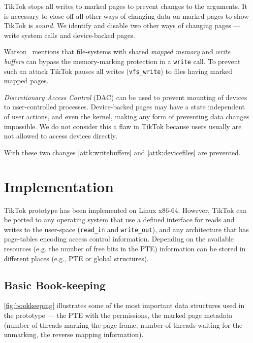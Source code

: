 \documentclass[conference]{IEEEtran}
\newcommand{\sysname}{TikTok}
\begin{document}
\sysname{} stops all writes to marked pages to prevent changes to the arguments.
It is necessary to close off all other ways of changing data on marked pages to
show \sysname{} is \emph{sound}. We identify and disable two other ways of
changing pages --- write system calls and device-backed pages.

Watson~\cite{watson2007exploiting} mentions that file-systems with shared
\emph{mapped memory} and \emph{write buffers} can bypass the memory-marking
protection in a \texttt{write} call. To prevent such an attack \sysname{} pauses
all writes (\texttt{vfs\_write}) to files having marked mapped pages.

\emph{Discretionary Access Control} (DAC) can be used to prevent mounting of
devices to user-controlled processes. Device-backed pages may have a state
independent of user actions, and even the kernel, making any form of preventing
data changes impossible. We do not consider this a flaw in \sysname{} because
users usually are not allowed to access devices directly.

With these two changes \autoref{attk:writebuffers} and \autoref{attk:devicefiles}
are prevented.


\section{Implementation}
\label{sec:implementation}

\sysname{} prototype has been implemented on Linux x86-64. However, \sysname{}
can be ported to any operating system that use a defined interface for reads and
writes to the user-space (\texttt{read\_in} and \texttt{write\_out}), and any
architecture that has page-tables encoding access control information. Depending
on the available resources (e.g. the number of free bits in the PTE) information
can be stored in different places (e.g., PTE or global structures).

\subsection{Basic Book-keeping}
\autoref{fig:bookkeeping} illustrates some of the most important data structures
used in the prototype --- the PTE with the permissions, the marked page metadata
(number of threads marking the page frame, number of threads waiting for the
unmarking, the reverse mapping information). 
\end{document}
